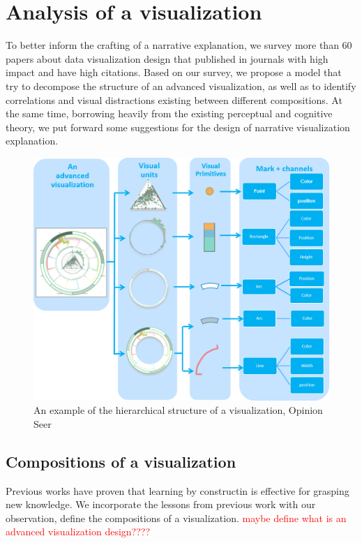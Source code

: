\documentclass[review,journal]{vgtc}         %
\newcommand{\wrong}[1]{\textcolor{red}{#1}}
\begin{document}
\section{Analysis of a visualization} 
To better inform the crafting of a narrative explanation, we survey more than 60 papers about data visualization design that published in journals with high impact and have high citations. Based on our survey, we propose a model that try to decompose the structure of an advanced visualization, as well as to identify correlations and visual distractions existing between different compositions. At the same time, borrowing heavily from the existing perceptual and cognitive theory, we put forward some suggestions for the design of narrative visualization explanation. 
\par
\begin{figure}
 \centering %
 \includegraphics[width=\columnwidth]{Picture2}
 \caption{An example of the hierarchical structure of a visualization, Opinion Seer\cite{wu_opinionseer:_2010}}
 \label{fig:sample}
\end{figure}
\subsection{Compositions of a visualization}
Previous works have proven that learning by constructin is effective for grasping new knowledge.\cite{huron_constructive_2014, chapman_constructive_1988}  We incorporate the lessons from previous work\cite{munzner_visualization_2014, huron_constructive_2014, chi_taxonomy_2000}  with our observation, define the compositions of a visualization. 
\wrong{maybe define what is an advanced visualization design????}
\end{document}
